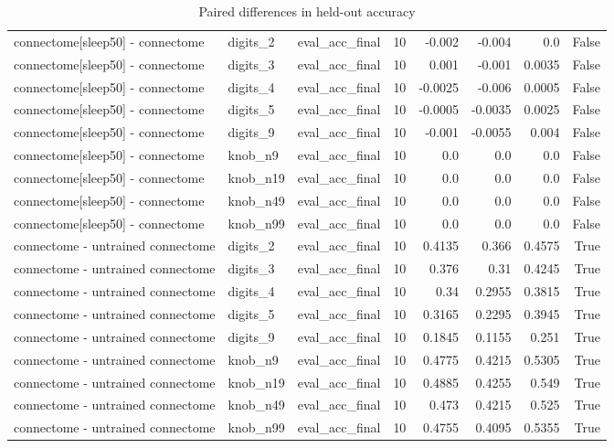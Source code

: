 \begin{table}[t]
\begin{tabular}{lllrrrrr}
connectome[sleep50] - connectome & digits\_2 & eval\_acc\_final & 10 & -0.002 & -0.004 & 0.0 & False \\
connectome[sleep50] - connectome & digits\_3 & eval\_acc\_final & 10 & 0.001 & -0.001 & 0.0035 & False \\
connectome[sleep50] - connectome & digits\_4 & eval\_acc\_final & 10 & -0.0025 & -0.006 & 0.0005 & False \\
connectome[sleep50] - connectome & digits\_5 & eval\_acc\_final & 10 & -0.0005 & -0.0035 & 0.0025 & False \\
connectome[sleep50] - connectome & digits\_9 & eval\_acc\_final & 10 & -0.001 & -0.0055 & 0.004 & False \\
connectome[sleep50] - connectome & knob\_n9 & eval\_acc\_final & 10 & 0.0 & 0.0 & 0.0 & False \\
connectome[sleep50] - connectome & knob\_n19 & eval\_acc\_final & 10 & 0.0 & 0.0 & 0.0 & False \\
connectome[sleep50] - connectome & knob\_n49 & eval\_acc\_final & 10 & 0.0 & 0.0 & 0.0 & False \\
connectome[sleep50] - connectome & knob\_n99 & eval\_acc\_final & 10 & 0.0 & 0.0 & 0.0 & False \\
connectome - untrained connectome & digits\_2 & eval\_acc\_final & 10 & 0.4135 & 0.366 & 0.4575 & True \\
connectome - untrained connectome & digits\_3 & eval\_acc\_final & 10 & 0.376 & 0.31 & 0.4245 & True \\
connectome - untrained connectome & digits\_4 & eval\_acc\_final & 10 & 0.34 & 0.2955 & 0.3815 & True \\
connectome - untrained connectome & digits\_5 & eval\_acc\_final & 10 & 0.3165 & 0.2295 & 0.3945 & True \\
connectome - untrained connectome & digits\_9 & eval\_acc\_final & 10 & 0.1845 & 0.1155 & 0.251 & True \\
connectome - untrained connectome & knob\_n9 & eval\_acc\_final & 10 & 0.4775 & 0.4215 & 0.5305 & True \\
connectome - untrained connectome & knob\_n19 & eval\_acc\_final & 10 & 0.4885 & 0.4255 & 0.549 & True \\
connectome - untrained connectome & knob\_n49 & eval\_acc\_final & 10 & 0.473 & 0.4215 & 0.525 & True \\
connectome - untrained connectome & knob\_n99 & eval\_acc\_final & 10 & 0.4755 & 0.4095 & 0.5355 & True \\
\bottomrule
\end{tabular}
\caption{Paired differences in held-out accuracy}
\label{tab:comparison_paired}
\end{table}